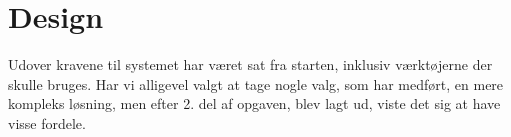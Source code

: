 \section{Design}
Udover kravene til systemet har været sat fra starten, inklusiv værktøjerne der skulle bruges. 
Har vi alligevel valgt at tage nogle valg, som har medført, en mere kompleks løsning, men efter 2. del af opgaven, blev lagt ud, viste det sig at have visse fordele.


